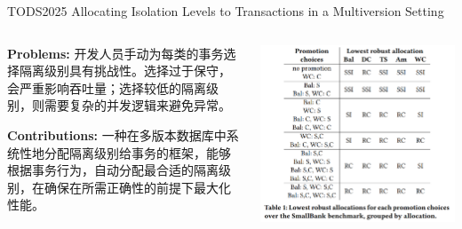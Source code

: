 
\begin{frame}{TODS2025 Allocating Isolation Levels to Transactions in a Multiversion Setting}
	\begin{columns}
		\begin{column}{0.5\textwidth}
			\textbf{Problems: }开发人员手动为每类的事务选择隔离级别具有挑战性。选择过于保守，会严重影响吞吐量；选择较低的隔离级别，则需要复杂的并发逻辑来避免异常。

			\textbf{Contributions: }一种在多版本数据库中系统性地分配隔离级别给事务的框架，能够根据事务行为，自动分配最合适的隔离级别，在确保在所需正确性的前提下最大化性能。
		\end{column}
		\begin{column}{0.5\textwidth}
			\includegraphics[width=0.98\linewidth]{figs/lowest-robust-allocations}
		\end{column}
	\end{columns}
\end{frame}

